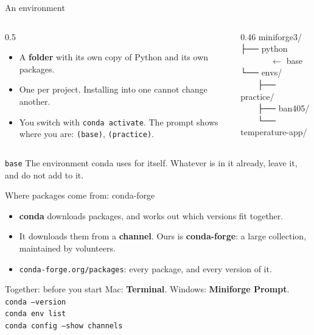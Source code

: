\documentclass[aspectratio=169,11pt]{beamer}
\newcommand{\code}[1]{\texttt{#1}}
\newcommand{\key}[1]{\textbf{\textcolor{ban}{#1}}}
\begin{document}
\begin{frame}{An environment}
  \begin{columns}[T]
    \begin{column}{0.5\textwidth}
      \begin{itemize}
        \item A \key{folder} with its own copy of Python and its own packages.
        \item One per project. Installing into one cannot change another.
        \item You switch with \code{conda activate}. The prompt shows where you are: \code{(base)}, \code{(practice)}.
      \end{itemize}
    \end{column}
    \begin{column}{0.46\textwidth}
      \ttfamily\small
      \textcolor{softgray}{miniforge3/}\\
      ├── python \ \ \ \ \ \ \ \textcolor{ban}{$\leftarrow$ base}\\
      └── envs/\\
      \ \ \ \ ├── practice/\\
      \ \ \ \ ├── ban405/\\
      \ \ \ \ └── temperature-app/
    \end{column}
  \end{columns}
  \vspace{1em}
  \begin{block}{\code{base}}
    The environment conda uses for itself. Whatever is in it already, leave it, and do not add to it.
  \end{block}
\end{frame}

\begin{frame}{Where packages come from: conda-forge}
  \begin{itemize}
    \item \key{conda} downloads packages, and works out which versions fit together.
    \item It downloads them from a \key{channel}. Ours is \key{conda-forge}: a large collection, maintained by volunteers.
    \item \code{conda-forge.org/packages}: every package, and every version of it.
  \end{itemize}
  \vspace{0.6em}
  \begin{block}{Together: before you start}
    Mac: \textbf{Terminal}. Windows: \textbf{Miniforge Prompt}.\\[0.3em]
    \code{conda --version}\\
    \code{conda env list} \\
    \code{conda config --show channels}\\[0.3em]
  \end{block}
\end{frame}
\end{document}
